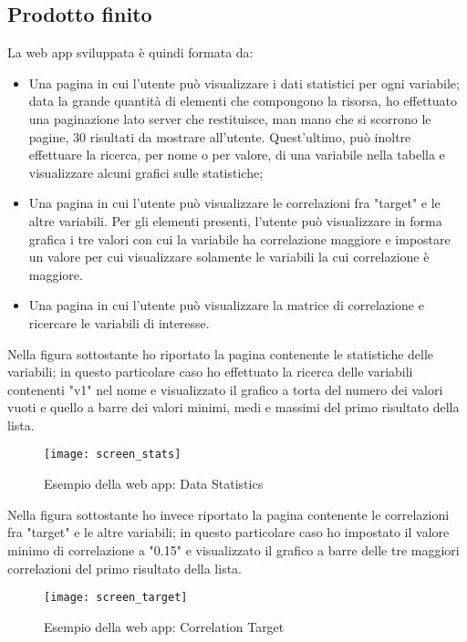 \subsection{Prodotto finito}
La \gls{web app} sviluppata è quindi formata da:
\begin{itemize}
	\item Una pagina in cui l'utente può visualizzare i dati statistici per ogni variabile; data la grande quantità di elementi che compongono la risorsa, ho effettuato una paginazione lato server che restituisce, man mano che si scorrono le pagine, 30 risultati da mostrare all'utente. Quest'ultimo, può inoltre effettuare la ricerca, per nome o per valore, di una variabile nella tabella e visualizzare alcuni grafici sulle statistiche;
	\item Una pagina in cui l'utente può visualizzare le correlazioni fra "target" e le altre variabili. Per gli elementi presenti, l'utente può visualizzare in forma grafica i tre valori con cui la variabile ha correlazione maggiore e impostare un valore per cui visualizzare solamente le variabili la cui correlazione è maggiore.
	\item Una pagina in cui l'utente può visualizzare la matrice di correlazione e ricercare le variabili di interesse.
\end{itemize}
Nella figura sottostante ho riportato la pagina contenente le statistiche delle variabili; in questo particolare caso ho effettuato la ricerca delle variabili contenenti "v1" nel nome e visualizzato il grafico a torta del numero dei valori vuoti e quello a barre dei valori minimi, medi e massimi del primo risultato della lista.\\
\begin{figure}[!h]
	\centering
	\texttt{[image: screen\_stats]}
	\caption{Esempio della web app: Data Statistics}
\end{figure}
\clearpage
\noindent Nella figura sottostante ho invece riportato la pagina contenente le correlazioni fra "target" e le altre variabili; in questo particolare caso ho impostato il valore minimo di correlazione a "0.15" e visualizzato il grafico a barre delle tre maggiori correlazioni del primo risultato della lista.\\
\begin{figure}[!h]
	\centering
	\texttt{[image: screen\_target]}
	\caption{Esempio della web app: Correlation Target}
\end{figure}

\newpage
